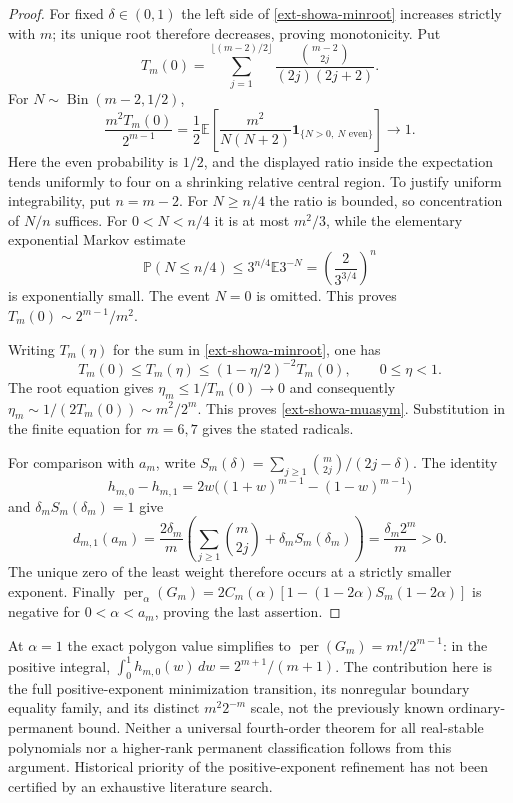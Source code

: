 \documentclass[11pt,a4paper]{article}
\theoremstyle{definition}\newtheorem{definition}[theorem]{Definition}
\theoremstyle{remark}\newtheorem{remark}[theorem]{Remark}
\numberwithin{equation}{section}
\begin{document}
\begin{proof}
For fixed $\delta\in(0,1)$ the left side of
\eqref{ext-showa-minroot} increases strictly with $m$; its unique root
therefore decreases, proving monotonicity.
Put
\[
 T_m(0)=\sum_{j=1}^{\lfloor(m-2)/2\rfloor}
       \frac{\binom{m-2}{2j}}{(2j)(2j+2)}.
\]
For $N\sim\operatorname{Bin}(m-2,1/2)$,
\[
 \frac{m^2T_m(0)}{2^{m-1}}
  =\frac12\mathbb E\left[
    \frac{m^2}{N(N+2)}\mathbf1_{\{N>0,\ N\text{ even}\}}\right]
  \longrightarrow1.
\]
Here the even probability is $1/2$, and the displayed ratio inside the
expectation tends uniformly to four on a shrinking relative central
region. To justify uniform integrability, put $n=m-2$. For
$N\ge n/4$ the ratio is bounded, so concentration of $N/n$ suffices.
For $0<N<n/4$ it is at most $m^2/3$, while the elementary exponential
Markov estimate
\[
 \mathbb P(N\le n/4)
 \le3^{n/4}\mathbb E3^{-N}
 =\left(\frac2{3^{3/4}}\right)^n
\]
is exponentially small. The event $N=0$ is omitted. This proves
$T_m(0)\sim2^{m-1}/m^2$.

Writing $T_m(\eta)$ for the sum in \eqref{ext-showa-minroot}, one has
\[
 T_m(0)\le T_m(\eta)
 \le(1-\eta/2)^{-2}T_m(0),\qquad 0\le\eta<1.
\]
The root equation gives $\eta_m\le1/T_m(0)\to0$ and consequently
$\eta_m\sim1/(2T_m(0))\sim m^2/2^m$. This proves
\eqref{ext-showa-muasym}. Substitution in the finite equation for
$m=6,7$ gives the stated radicals.

For comparison with $a_m$, write
$S_m(\delta)=\sum_{j\ge1}\binom m{2j}/(2j-\delta)$.
The identity
\[
 h_{m,0}-h_{m,1}
  =2w\bigl((1+w)^{m-1}-(1-w)^{m-1}\bigr)
\]
and $\delta_mS_m(\delta_m)=1$ give
\[
 d_{m,1}(a_m)
 =\frac{2\delta_m}{m}
   \left(\sum_{j\ge1}\binom m{2j}
      +\delta_mS_m(\delta_m)\right)
 =\frac{\delta_m2^m}{m}>0.
\]
The unique zero of the least weight therefore occurs at a strictly
smaller exponent. Finally
$\operatorname{per}_{\alpha}(G_m)=
2C_m(\alpha)[1-(1-2\alpha)S_m(1-2\alpha)]$
is negative for $0<\alpha<a_m$, proving the last assertion.
\end{proof}

At $\alpha=1$ the exact polygon value simplifies to
$\operatorname{per}(G_m)=m!/2^{m-1}$: in the positive integral,
$\int_0^1 h_{m,0}(w)\,dw=2^{m+1}/(m+1)$.
The contribution here is the full positive-exponent minimization
transition, its nonregular boundary equality family, and its distinct
$m^2 2^{-m}$ scale, not the previously known ordinary-permanent bound.
Neither a universal fourth-order theorem for all real-stable polynomials
nor a higher-rank permanent classification follows from this argument.
Historical priority of the positive-exponent refinement has not been
certified by an exhaustive literature search.
\end{document}
